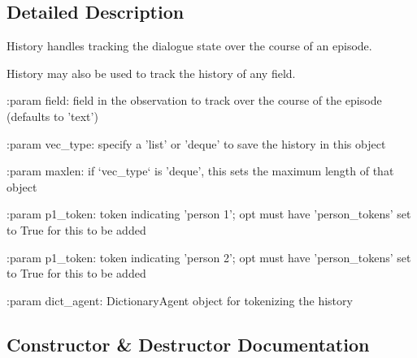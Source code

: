 \subsection{Detailed Description}
\begin{DoxyVerb}History handles tracking the dialogue state over the course of an episode.

History may also be used to track the history of any field.

:param field:
    field in the observation to track over the course of the episode
    (defaults to 'text')

:param vec_type:
    specify a 'list' or 'deque' to save the history in this object

:param maxlen:
    if `vec_type` is 'deque', this sets the maximum length of that object

:param p1_token:
    token indicating 'person 1'; opt must have 'person_tokens' set to True
    for this to be added

:param p1_token:
    token indicating 'person 2'; opt must have 'person_tokens' set to True
    for this to be added

:param dict_agent:
    DictionaryAgent object for tokenizing the history
\end{DoxyVerb}
 

\subsection{Constructor \& Destructor Documentation}
\mbox{\label{classparlai_1_1core_1_1torch__agent_1_1History_af2670eff50563dcee5da6581355e758f}} 
